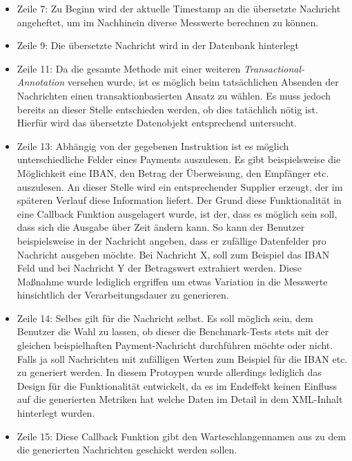 \begin{itemize}
  \item Zeile 7: Zu Beginn wird der aktuelle Timestamp an die übersetzte Nachricht angeheftet, um im Nachhinein diverse Messwerte berechnen zu können.

  \item Zeile 9: Die übersetzte Nachricht wird in der Datenbank hinterlegt

  \item Zeile 11: Da die gesamte Methode mit einer weiteren \emph{Transactional-Annotation} versehen wurde, ist es möglich beim tatsächlichen Absenden der Nachrichten einen transaktionbasierten Ansatz zu wählen. Es muss jedoch bereits an dieser Stelle entschieden werden, ob dies tatächlich nötig ist. Hierfür wird das übersetzte Datenobjekt entsprechend untersucht. 

  \item Zeile 13: Abhängig von der gegebenen Instruktion ist es möglich unterschiedliche Felder eines Payments auszulesen. Es gibt beispielsweise die Möglichkeit eine IBAN, den Betrag der Überweisung, den Empfänger etc. auszulesen. An dieser Stelle wird ein entsprechender Supplier erzeugt, der im späteren Verlauf diese Information liefert. Der Grund diese Funktionalität in eine Callback Funktion ausgelagert wurde, ist der, dass es möglich sein soll, dass sich die Ausgabe über Zeit ändern kann. So kann der Benutzer beispielsweise in der Nachricht angeben, dass er zufällige Datenfelder pro Nachricht ausgeben möchte. Bei Nachricht X, soll zum Beispiel das IBAN Feld und bei Nachricht Y der Betragswert extrahiert werden. Diese Maßnahme wurde lediglich ergriffen um etwas Variation in die Messwerte hinsichtlich der Verarbeitungsdauer zu generieren.

  \item Zeile 14: Selbes gilt für die Nachricht selbst. Es soll möglich sein, dem Benutzer die Wahl zu lassen, ob dieser die Benchmark-Tests stets mit der gleichen beispielhaften Payment-Nachricht durchführen möchte oder nicht. Falls ja soll Nachrichten mit zufälligen Werten zum Beispiel für die IBAN etc. zu generiert werden. In diesem Protoypen wurde allerdings lediglich das Design für die Funktionalität entwickelt, da es im Endeffekt keinen Einfluss auf die generierten Metriken hat welche Daten im Detail in dem XML-Inhalt hinterlegt wurden.

  \item Zeile 15: Diese Callback Funktion gibt den Warteschlangennamen aus zu dem die generierten Nachrichten geschickt werden sollen.
  

\end{itemize}
